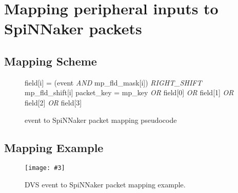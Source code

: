 \documentclass[11pt,a4paper,twoside]{article}
\newcommand{\image}[5][]
{
\begin{figure}[#2]
   \begin{center}
      \texttt{[image: \#3]}
      \caption{#5}
      \label{fig:#4}
   \end{center}
\end{figure}
}
\begin{document}
\clearpage
\section{Mapping peripheral inputs to SpiNNaker packets}


\subsection{Mapping Scheme}


\begin{figure}[!ht]
	\centering
	\begin{minipage}{0.85\columnwidth}
		\begin{algorithm}[H]
			\caption{event to SpiNNaker packet mapping pseudocode}
			\begin{algorithmic}[1]
					\State field[i] = (event \textit{AND} mp\_fld\_mask[i]) \textit{RIGHT\_SHIFT} mp\_fld\_shift[i]
				\EndFor
				\State packet\_key = mp\_key \textit{OR} field[0] \textit{OR} field[1] \textit{OR} field[2] \textit{OR} field[3]
			\end{algorithmic}
			\label{alg:crd+cfc_fifo}
		\end{algorithm}
	\end{minipage}
\end{figure}


\subsection{Mapping Example}


\image[width = 0.9 \textwidth]{!h}{mapper_ex}{fig:maper_fig}
{DVS event to SpiNNaker packet mapping example.}
\end{document}

